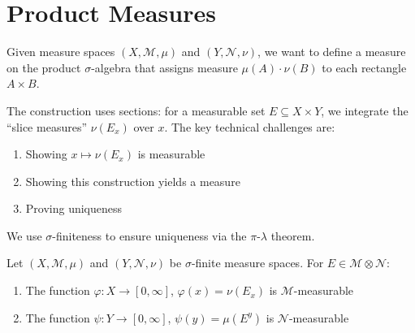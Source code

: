 \bigskip
\section{Product Measures}

\begin{intuition}
    Given measure spaces $(X, \mathcal{M}, \mu)$ and $(Y, \mathcal{N}, \nu)$, we want to define a 
    measure on the product $\sigma$-algebra that assigns measure $\mu(A) \cdot \nu(B)$ to each 
    rectangle $A \times B$. 
    
    The construction uses sections: for a measurable set $E \subseteq X \times Y$, we integrate the 
    ``slice measures'' $\nu(E_x)$ over $x$. The key technical challenges are:
    \begin{enumerate}
        \item Showing $x \mapsto \nu(E_x)$ is measurable
        \item Showing this construction yields a measure
        \item Proving uniqueness
    \end{enumerate}
    
    We use $\sigma$-finiteness to ensure uniqueness via the $\pi$-$\lambda$ theorem.
\end{intuition}

\bigskip
\begin{lemma}
    Let $(X, \mathcal{M}, \mu)$ and $(Y, \mathcal{N}, \nu)$ be $\sigma$-finite measure spaces. 
    For $E \in \mathcal{M} \otimes \mathcal{N}$:
    \begin{enumerate}
        \item The function $\varphi: X \to [0, \infty]$, $\varphi(x) = \nu(E_x)$ is $\mathcal{M}$-measurable
        \item The function $\psi: Y \to [0, \infty]$, $\psi(y) = \mu(E^y)$ is $\mathcal{N}$-measurable
    \end{enumerate}
\end{lemma}

